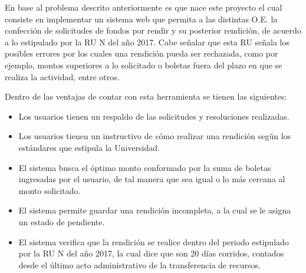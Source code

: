 En base al problema descrito anteriormente es que nace este proyecto el cual consiste en implementar un sistema web que permita a las distintas O.E. la confección de solicitudes de fondos por rendir y su posterior rendición, de acuerdo a lo estipulado por la RU N del año 2017. Cabe señalar que esta RU señala los posibles errores por los cuales una rendición pueda ser rechazada, como por ejemplo, montos superiores a lo solicitado o boletas fuera del plazo en que se realiza la actividad, entre otros.

Dentro de las ventajas de contar con esta herramienta se tienen las siguientes:

\begin{itemize}
    \item Los usuarios tienen un respaldo de las solicitudes y resoluciones realizadas.
    \item Los usuarios tienen un instructivo de cómo realizar una rendición según los estándares que estipula la Universidad.
    \item El sistema busca el óptimo monto conformado por la suma de boletas ingresadas por el usuario, de tal manera que sea igual o lo más cercana al monto solicitado.
    \item El sistema permite guardar una rendición incompleta, a la cual se le asigna un estado de pendiente.
    \item El sistema verifica que la rendición se realice dentro del periodo estipulado por la RU N del año 2017, la cual dice que son 20 días corridos, contados desde el último acto administrativo de la transferencia de recursos.
\end{itemize}

